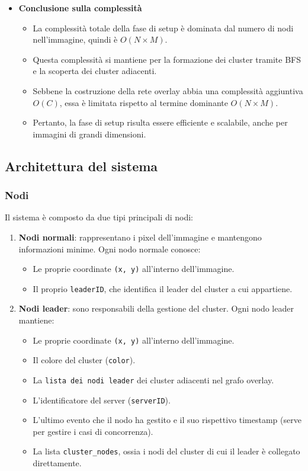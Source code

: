 \documentclass[12pt, a4paper]{report}
\begin{document}
\begin{itemize}
    \item \textbf{Conclusione sulla complessit\`a}
    \begin{itemize}
        \item La complessit\`a totale della fase di setup \`e dominata dal numero di nodi nell'immagine, quindi \`e $O(N \times M)$.
        \item Questa complessit\`a si mantiene per la formazione dei cluster tramite BFS e la scoperta dei cluster adiacenti.
        \item Sebbene la costruzione della rete overlay abbia una complessit\`a aggiuntiva $O(C)$, essa \`e limitata rispetto al termine dominante $O(N \times M)$.
        \item Pertanto, la fase di setup risulta essere efficiente e scalabile, anche per immagini di grandi dimensioni.
    \end{itemize}
\end{itemize}

\subsection{Architettura del sistema}

\subsubsection{Nodi}
Il sistema \`e composto da due tipi principali di nodi:

\begin{enumerate}
    \item \textbf{Nodi normali}: rappresentano i pixel dell'immagine e mantengono informazioni minime. Ogni nodo normale conosce:
    \begin{itemize}
        \item Le proprie coordinate \texttt{(x, y)} all'interno dell'immagine.
        \item Il proprio \texttt{leaderID}, che identifica il leader del cluster a cui appartiene.
    \end{itemize}

    \item \textbf{Nodi leader}: sono responsabili della gestione del cluster. Ogni nodo leader mantiene:
    \begin{itemize}
        \item Le proprie coordinate \texttt{(x, y)} all'interno dell'immagine.
        \item Il colore del cluster (\texttt{color}).
        \item La \texttt{lista dei nodi leader} dei cluster adiacenti nel grafo overlay.
        \item L'identificatore del server (\texttt{serverID}).
        \item L'ultimo evento che il nodo ha gestito e il suo rispettivo timestamp (serve per gestire i casi di concorrenza).
        \item La lista \texttt{cluster\_nodes}, ossia i nodi del cluster di cui il leader \`e collegato direttamente.
    \end{itemize}
\end{enumerate}
\end{document}
